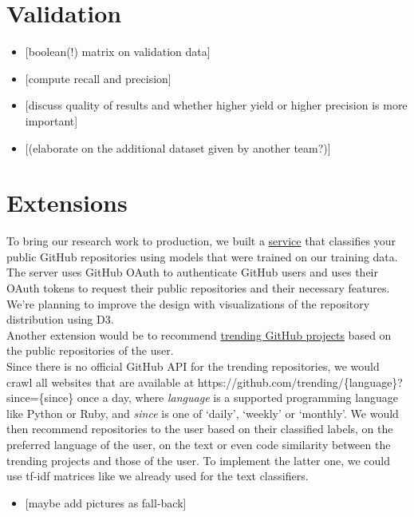 \documentclass{article}
\providecommand{\tightlist}{%
  \setlength{\itemsep}{0pt}\setlength{\parskip}{0pt}}
\begin{document}
\section{Validation}\label{validation}

\begin{itemize}
\tightlist
\item
  {[}boolean(!) matrix on validation data{]}
\item
  {[}compute recall and precision{]}
\item
  {[}discuss quality of results and whether higher yield or higher
  precision is more important{]}
\item
  {[}(elaborate on the additional dataset given by another team?){]}
\end{itemize}

\section{Extensions}\label{extensions}

To bring our research work to production, we built a
\href{https://git-better.herokuapp.com/}{service} that classifies your
public GitHub repositories using models that were trained on our
training data. The server uses GitHub OAuth to authenticate GitHub users
and uses their OAuth tokens to request their public repositories and
their necessary features. We're planning to improve the design with
visualizations of the repository distribution using D3.\\
Another extension would be to recommend
\href{https://github.com/trending}{trending GitHub projects} based on
the public repositories of the user.\\
Since there is no official GitHub API for the trending repositories, we
would crawl all websites that are available at
https://github.com/trending/\{language\}?since=\{since\} once a day,
where \emph{language} is a supported programming language like Python or
Ruby, and \emph{since} is one of `daily', `weekly' or `monthly'. We
would then recommend repositories to the user based on their classified
labels, on the preferred language of the user, on the text or even code
similarity between the trending projects and those of the user. To
implement the latter one, we could use tf-idf matrices like we already
used for the text classifiers.

\begin{itemize}
\tightlist
\item
  {[}maybe add pictures as fall-back{]}
\end{itemize}
\end{document}
